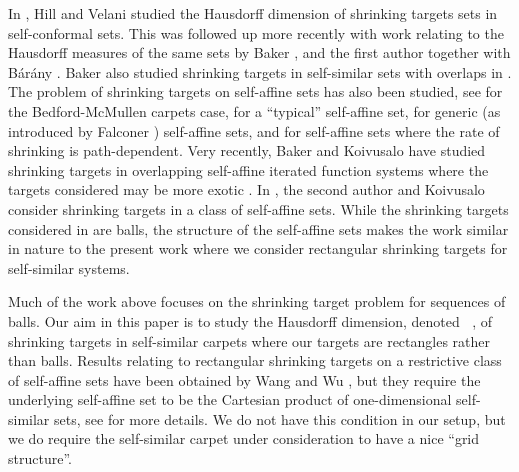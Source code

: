 \documentclass[12pt]{article}
\theoremstyle{remark}
\numberwithin{equation}{section}
\newcommand{\0}{\mathbf{0}}
\DeclareMathOperator{\dimh}{\dim_H}
\begin{document}
In \cite{HillVelani99}, Hill and Velani studied the Hausdorff dimension of shrinking targets sets in self-conformal sets.  This was followed up more recently with work relating to the Hausdorff measures of the same sets by Baker \cite{Baker2019}, and the first author together with B\'{a}r\'{a}ny \cite{AllenBarany}. Baker also studied shrinking targets in self-similar sets with overlaps in \cite{BakerMemoirs}. The problem of shrinking targets on self-affine sets has also been studied, see \cite{BaranyRams} for the Bedford-McMullen carpets case, \cite{KoivusaloRamirezSelfAffine} for a ``typical'' self-affine set, \cite{BaranyTroscheitRandomisedTranslations} for generic (as introduced by Falconer \cite{Falconer1988}) self-affine sets, and \cite{KoivusaloLiaoRamsPathDependent} for self-affine sets where the rate of shrinking is path-dependent. Very recently, Baker and Koivusalo have studied shrinking targets in overlapping self-affine iterated function systems where the targets considered may be more exotic \cite{BakerKoivusalo}. In \cite{JordanKoivusaloPU}, the second author and Koivusalo consider shrinking targets in a class of self-affine sets. While the shrinking targets considered in \cite{JordanKoivusaloPU} are balls, the structure of the self-affine sets makes the work similar in nature to the present work where we consider rectangular shrinking targets for self-similar systems.

Much of the work above focuses on the shrinking target problem for sequences of balls. Our aim in this paper is to study the Hausdorff dimension, denoted $\dimh$, of shrinking targets in self-similar carpets where our targets are rectangles rather than balls. Results relating to rectangular shrinking targets on a restrictive class of self-affine sets have been obtained by Wang and Wu \cite[Section 12]{WangWu}, but they require the underlying self-affine set to be the Cartesian product of one-dimensional self-similar sets, see \cite{WangWu} for more details. We do not have this condition in our setup, but we do require the self-similar carpet under consideration to have a nice ``grid structure''. 
\end{document}
